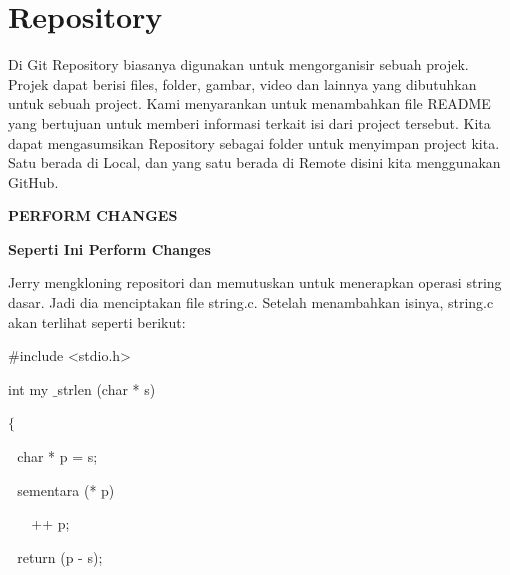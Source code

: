 \section{Repository}
\noindent 
Di Git Repository biasanya digunakan untuk mengorganisir sebuah projek. Projek dapat berisi files, folder, gambar, video dan lainnya yang dibutuhkan untuk sebuah project. Kami menyarankan untuk menambahkan file README yang bertujuan untuk memberi informasi terkait isi dari project tersebut. Kita dapat mengasumsikan Repository sebagai folder untuk menyimpan project kita. Satu berada di Local, dan yang satu berada di Remote disini kita menggunakan GitHub. \par
\vspace{\baselineskip}
\vspace{12pt}
\noindent 
\begin{center}{\fontsize{14pt}{14pt}\selectfont \textbf{PERFORM CHANGES} \\}\end{center} \par
\vspace{\baselineskip}
\noindent 
{\fontsize{14pt}{14pt}\selectfont \textbf{Seperti Ini Perform Changes} \\} \par
\noindent 
 \hspace*{0.5in} Jerry mengkloning repositori dan memutuskan untuk menerapkan operasi string dasar. Jadi dia menciptakan file string.c. Setelah menambahkan isinya, string.c akan terlihat seperti berikut: \par
\vspace{12pt}
\noindent 
 \hspace*{0.5in}  $  \#  $include <stdio.h> \par
\noindent 
 \hspace*{0.5in} int my $  \_  $strlen (char * s) \hspace*{0.5in}  \par
\noindent 
 \hspace*{0.5in}  $  \{  $ \par
\noindent 
 \hspace*{0.5in}  $  $ $  $ $  $char * p = s; \par
\noindent 
 \hspace*{0.5in}  $  $ $  $ $  $sementara (* p) \par
\noindent 
 \hspace*{0.5in}  $  $ $  $ $  $ $  $ $  $ $  $++ p; \par
\noindent 
 \hspace*{0.5in}  $  $ $  $ $  $return (p - s); \par
